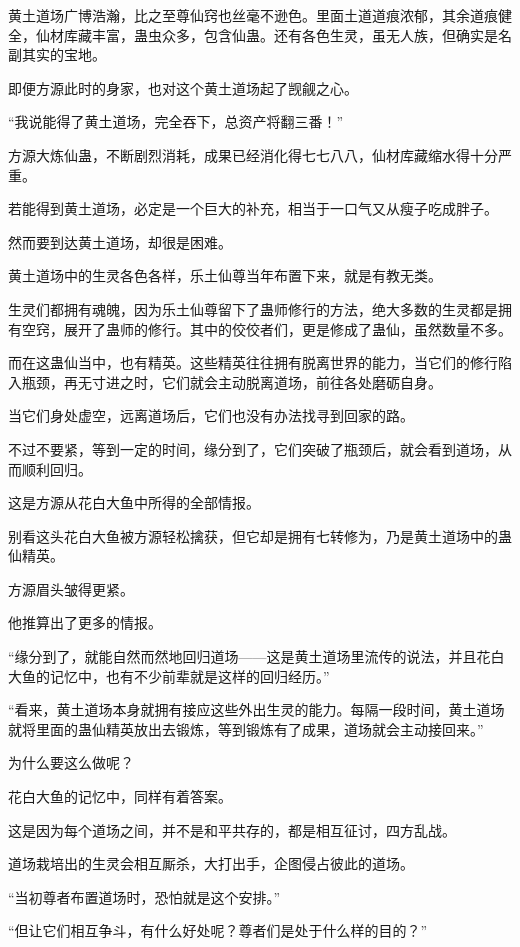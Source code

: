 \begin{this_body}
黄土道场广博浩瀚，比之至尊仙窍也丝毫不逊色。里面土道道痕浓郁，其余道痕健全，仙材库藏丰富，蛊虫众多，包含仙蛊。还有各色生灵，虽无人族，但确实是名副其实的宝地。

即便方源此时的身家，也对这个黄土道场起了觊觎之心。

“我说能得了黄土道场，完全吞下，总资产将翻三番！”

方源大炼仙蛊，不断剧烈消耗，成果已经消化得七七八八，仙材库藏缩水得十分严重。

若能得到黄土道场，必定是一个巨大的补充，相当于一口气又从瘦子吃成胖子。

然而要到达黄土道场，却很是困难。

黄土道场中的生灵各色各样，乐土仙尊当年布置下来，就是有教无类。

生灵们都拥有魂魄，因为乐土仙尊留下了蛊师修行的方法，绝大多数的生灵都是拥有空窍，展开了蛊师的修行。其中的佼佼者们，更是修成了蛊仙，虽然数量不多。

而在这蛊仙当中，也有精英。这些精英往往拥有脱离世界的能力，当它们的修行陷入瓶颈，再无寸进之时，它们就会主动脱离道场，前往各处磨砺自身。

当它们身处虚空，远离道场后，它们也没有办法找寻到回家的路。

不过不要紧，等到一定的时间，缘分到了，它们突破了瓶颈后，就会看到道场，从而顺利回归。

这是方源从花白大鱼中所得的全部情报。

别看这头花白大鱼被方源轻松擒获，但它却是拥有七转修为，乃是黄土道场中的蛊仙精英。

方源眉头皱得更紧。

他推算出了更多的情报。

“缘分到了，就能自然而然地回归道场——这是黄土道场里流传的说法，并且花白大鱼的记忆中，也有不少前辈就是这样的回归经历。”

“看来，黄土道场本身就拥有接应这些外出生灵的能力。每隔一段时间，黄土道场就将里面的蛊仙精英放出去锻炼，等到锻炼有了成果，道场就会主动接回来。”

为什么要这么做呢？

花白大鱼的记忆中，同样有着答案。

这是因为每个道场之间，并不是和平共存的，都是相互征讨，四方乱战。

道场栽培出的生灵会相互厮杀，大打出手，企图侵占彼此的道场。

“当初尊者布置道场时，恐怕就是这个安排。”

“但让它们相互争斗，有什么好处呢？尊者们是处于什么样的目的？”


\end{this_body}
